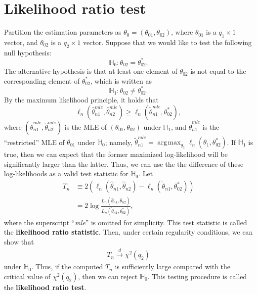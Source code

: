 \documentclass[10.5pt, A4paper, openany, uplatex]{book}
\newcommand{\mbb}{\mathbb}
\renewcommand{\hat}{\widehat}
\renewcommand{\tilde}{\widetilde}
\numberwithin{equation}{section}
\DeclareMathOperator*{\argmax}{\arg\!\max}
\begin{document}
\section{Likelihood ratio test}\label{sec:LRT}
Partition the estimation parameters as $\theta_0 = (\theta_{01}, \theta_{02})$, where $\theta_{01}$ is a $q_1 \times 1$ vector, and $\theta_{02}$ is a $q_2 \times 1$ vector.
Suppose that we would like to test the following null hypothesis:
\[
	\mbb{H}_0: \theta_{02} = \theta_{02}^*.
\]
The alternative hypothesis is that at least one element of $\theta_{02}$ is not equal to the corresponding element of $\theta_{02}^*$, which is written as
\[
	\mbb{H}_1: \theta_{02} \neq \theta_{02}^*.
\]
By the maximum likelihood principle, it holds that 
\[
	\ell_n(\hat \theta_{n1}^{mle}, \hat \theta_{n2}^{mle}) \ge \ell_n(\tilde \theta_{n1}^{mle}, \theta_{02}^*),
\]
where $(\hat \theta_{n1}^{mle}, \hat \theta_{n2}^{mle})$ is the MLE of $(\theta_{01}, \theta_{02})$ under $\mbb{H}_1$, and $\tilde \theta_{n1}^{mle}$ is the ``restricted'' MLE of $\theta_{01}$ under $\mbb{H}_0$; namely, $\tilde \theta_{n1}^{mle} = \argmax_{\theta_1} \ell_n(\theta_1, \theta_{02}^*)$.
If $\mbb{H}_1$ is true, then we can expect that the former maximized log-likelihood will be significantly larger than the latter.
Thus, we can use the the difference of these log-likelihoods as a valid test statistic for $\mbb{H}_0$.
Let
\begin{align*}
	T_n 
	& \equiv 2\left(\ell_n(\hat \theta_{n1}, \hat \theta_{n2}) - \ell_n(\tilde \theta_{n1}, \theta_{02}^*) \right)\\
	& = 2 \log \frac{L_n( \hat \theta_{n1}, \hat \theta_{n2})}{L_n( \tilde \theta_{n1}, \theta_{02}^*)},
\end{align*}
where the superscript ``\textit{mle}'' is omitted for simplicity.
This test statistic is called the \textbf{likelihood ratio statistic}. 
Then, under certain regularity conditions, we can show that 
\begin{align}\label{eq:LRT}
T_n \overset{d}{\to} \chi^2(q_2)
\end{align}
under $\mbb{H}_0$.
Thus, if the computed $T_n$ is sufficiently large compared with the critical value of $\chi^2(q_2)$, then we can reject $\mbb{H}_0$.
This testing procedure is called the \textbf{likelihood ratio test}.
\bigskip
\end{document}
